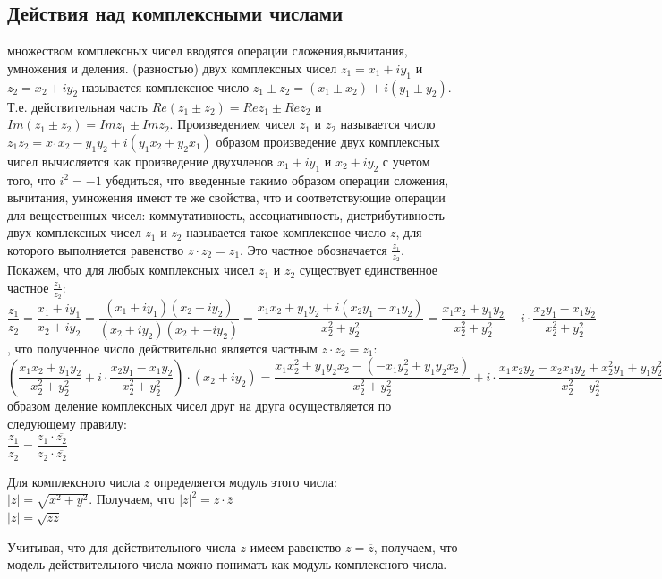 \documentclass[oneside]{book}
\begin{document}
\begin{enumerate}
\begin{itemize}
\begin{enumerate}
\section{Действия над комплексными числами}
 множеством комплексных чисел вводятся операции сложения,вычитания, умножения и деления.
 (разностью) двух комплексных чисел $z_1=x_1+iy_1$ и $z_2=x_2+iy_2$ называется комплексное число $z_1\pm z_2=(x_1 \pm x_2)+i(y_1\pm y_2)$. Т.е. действительная часть $Re(z_1\pm z_2)=Rez_1\pm Rez_2$ и $Im(z_1\pm z_2)=Imz_1\pm Imz_2$. Произведением чисел $z_1$ и $z_2$ называется число $z_1z_2=x_1x_2-y_1y_2+i(y_1x_2+y_2x_1)$
 образом произведение двух комплексных чисел вычисляется как произведение двухчленов $x_1+iy_1$ и $x_2+iy_2$ с учетом того, что $i^2=-1$
 убедиться, что введенные такимо образом операции сложения, вычитания, умножения имеют те же свойства, что и соответствующие операции для вещественных чисел: коммутативность, ассоциативность, дистрибутивность
 двух комплексных чисел $z_1$ и $z_2$ называется такое комплексное число $z$, для которого выполняется равенство $z\cdot z_2=z_1$. Это частное обозначается $\frac{z_1}{z_2}$. Покажем, что для любых комплексных чисел $z_1$ и $z_2$ существует единственное частное $\frac{z_1}{z_2}$:\\
$\dfrac{z_1}{z_2}=\dfrac{x_1+iy_1}{x_2+iy_2}=\dfrac{(x_1+iy_1)(x_2-iy_2)}{(x_2+iy_2)(x_2+-iy_2)}=\dfrac{x_1x_2+y_1y_2+i(x_2y_1-x_1y_2)}{x_2^2+y_2^2}=\dfrac{x_1x_2+y_1y_2}{x_2^2+y_2^2}+i\cdot \dfrac{x_2y_1-x_1y_2}{x_2^2+y_2^2}$
, что полученное число действительно является частным $z\cdot z_2=z_1$:\\
$(\dfrac{x_1x_2+y_1y_2}{x_2^2+y_2^2}+i\cdot \dfrac{x_2y_1-x_1y_2}{x_2^2+y_2^2})\cdot (x_2+iy_2)=\dfrac{x_1x_2^2+y_1y_2x_2-(-x_1y_2^2+y_1y_2x_2)}{x_2^2+y_2^2}+i\cdot \dfrac{x_1x_2y_2-x_2x_1y_2+x_2^2y_1+y_1y_2^2}{x_2^2+y_2^2}=\dfrac{x_1(x_2^2+y_2^2)}{x_2^2+y_2^2}+i\cdot \dfrac{y_1(x_2^2+y_2^2)}{x_2^2+y_2^2}=x_1+iy_1=z_1$
 образом деление комплексных чисел друг на друга осуществляется по следующему правилу:\\
$\dfrac{z_1}{z_2}=\dfrac{z_1\cdot \overline{z_2}}{z_2\cdot \overline{z_2}}$
\par Для комплексного числа $z$ определяется модуль этого числа: \\$|z|=\sqrt{x^2+y^2}$. Получаем, что $|z|^2=z\cdot \overline{z}$\\
$|z|=\sqrt{z\overline{z}}$
\par Учитывая, что для действительного числа $z$ имеем равенство $z=\overline{z}$, получаем, что модель действительного числа можно понимать как модуль комплексного числа.

\end{enumerate}
\end{itemize}
\end{enumerate}
\end{document}
